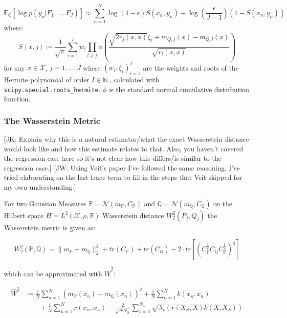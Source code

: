 \documentclass[twoside,11pt]{article}
\newcommand{\jk}[1]{{\color{blue} [JK: #1]}}
\newcommand{\jw}[1]{{\color{gray} [JW: #1]}}
\begin{document}
\[\mathbb{E}_{\mathbb{Q}}\left[ \log p(y_n | F_1, \dots, F_J)\right] \approx \sum_{n=1}^{N} \log(1-\epsilon)S(x_n, y_n) + \log \left(\frac{\epsilon}{J-1}\right)(1-S(x_n, y_n))\]
where:
\[S(x, j) \coloneqq \frac{1}{\sqrt{\pi}} \sum_{i=1}^I w_i \prod_{l\neq j} \phi \left( \frac{\sqrt{2 r_j (x, x)}\xi_i + m_{Q, j}(x) - m_{Q, l}(x)}{\sqrt{r_l (x, x)}}\right)\]
for any $x \in \mathcal{X}$, $j=1, \dots, J$ where $(w_i, \xi_i)_{i=1}^I$ are the weights and roots of the Hermite polynomial of order $I \in \mathbb{N}$., calculated with \verb|scipy.special.roots_hermite|.
$\phi$ is the standard normal cumulative distribution function.

\subsubsection{The Wasserstein Metric}\label{subsec:wasserstein-metric}


%
\jk{Explain why this is a natural estimator/what the exact Wasserstein distance would look like and how this estimate relates to that. Also, you haven't covered the regression case here so it's not clear how this differs/is similar to the regression case.}
\jw{Using Veit's paper I've followed the same reasoning. I've tried elaborating on the last trace term to fill in the steps that Veit skipped for my own understanding.}
%

For two Gaussian Measures $\mathbb{P} = \mathcal{N}(m_{\mathbb{P}}, C_{\mathbb{P}})$ and $\mathbb{Q} = \mathcal{N}(m_{\mathbb{Q}}, C_{\mathbb{Q}})$ on the Hilbert space $H=L^2(\mathcal{X}, \rho, \mathbb{R})$ Wasserstein distance $W_2^2(P_j, Q_j)$ the Wasserstein metric is given as:

\[W_2^2(\mathbb{P}, \mathbb{Q}) = \|m_{\mathbb{P}} - m_{\mathbb{Q}}\|_2^2 + tr(C_{\mathbb{P}}) + tr(C_{\mathbb{Q}}) - 2 \cdot tr \left[ \left( C_{\mathbb{P}}^{\frac{1}{2}}C_{\mathbb{Q}}C_{\mathbb{P}}^{\frac{1}{2}}\right)^{\frac{1}{2}}\right]\]

which can be approximated with $\hat{W}^2$:

\[
\begin{split}
\hat{W}^2 & \coloneqq \frac{1}{N}\sum_{n=1}^N (m_{\mathbb{P}}(x_n)-m_{\mathbb{Q}}(x_n))^2 + \frac{1}{N}\sum_{n=1}^{N}k(x_n, x_n) \\
 &\qquad +\frac{1}{N}\sum_{n=1}^{N}r(x_n, x_n) - \frac{2}{\sqrt {N N_S}}\sum_{s=1}^{N_S}\sqrt {\lambda_s(r(X_S, X)k(X, X_S))} \\
\end{split}\label{eq:w-2-distance-approx}
\]
\end{document}
